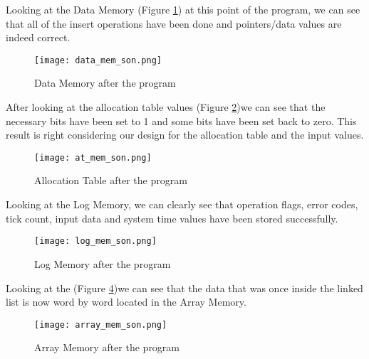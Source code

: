 \documentclass[pdftex,12pt,a4paper]{article}
\begin{document}
\begin{itemize}
    \newline Looking at the Data Memory (Figure \ref{fig:data_mem_son}) at this point of the program, we can see that all of the insert operations have been done and pointers/data values are indeed correct.




    \begin{figure}[H]
    \centering
    \texttt{[image: data\_mem\_son.png]}
    \caption{Data Memory after the program}
    \label{fig:data_mem_son}
    \end{figure}

    \newline After looking at the allocation table values (Figure \ref{fig:at_mem_son})we can see that the necessary bits have been set to 1 and some bits have been set back to zero. This result is right considering our design for the allocation table and the input values.

    \begin{figure}[H]
    \centering
    \texttt{[image: at\_mem\_son.png]}
    \caption{Allocation Table after the program}
    \label{fig:at_mem_son}
    \end{figure}
    
    \newline Looking at the Log Memory, we can clearly see that operation flags, error codes, tick count, input data and system time values have been stored successfully. 
    \begin{figure}[H]
    \centering
    \texttt{[image: log\_mem\_son.png]}
    \caption{Log Memory after the program}
    \label{fig:log_mem_son}
    \end{figure}
    
    \newline Looking at the (Figure \ref{fig:array_mem_son})we can see that the data that was once inside the linked list is now word by word located in the Array Memory.
    \begin{figure}[H]
    \centering
    \texttt{[image: array\_mem\_son.png]}
    \caption{Array Memory after the program}
    \label{fig:array_mem_son}
    \end{figure}

\end{itemize}
\newpage
\end{document}
